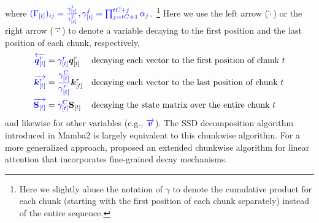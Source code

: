 \documentclass{article}
\def\rmS{{\mathbf{S}}}
\def\vk{{\bm{k}}}
\def\vq{{\bm{q}}}
\def\vv{{\bm{v}}}
\begin{document}
where ${\color{blue}(\Gamma_{[t]})_{ij} = \frac{\gamma_{[t]}^i}{\gamma_{[t]}^j}, \gamma_{[t]}^j = \prod_{j=tC+1}^{tC+j} \alpha_j}$.~\footnote{Here we slightly abuse the notation of $\gamma$ to denote the cumulative product for each chunk (starting with the first position of each chunk separately) instead of the entire sequence.}  Here we use the left arrow ($\overleftarrow{\cdot}$) or the right arrow ($\overrightarrow{\cdot}$) to denote a variable decaying to the first position and the last position of each chunk, respectively, \begin{align}    {\color{blue}\overleftarrow{\vq_{[t]}^r}} &= {\color{blue}\gamma_{[t]}^r} \vq_{[t]}^r && \text{decaying each vector to the first position of  chunk $t$} \nonumber \\ 
{\color{blue}\overrightarrow{\vk_{[t]}^r}} &= {\color{blue}\frac{\gamma_{[t
]}^{C}}{\gamma_{[t]}^r}} \vk_{[t]}^r  && \text{decaying each vector to the last position of  chunk $t$} \nonumber \\ 
{\color{blue}\overrightarrow{\rmS_{[t]}}} &= {\color{blue}\gamma_{[t]}^C}\rmS_{[t]}  && \text{decaying the state matrix over the entire chunk $t$} 
\label{eq:def_notation}
\end{align}
and likewise for other variables (e.g., ${\color{blue}\overrightarrow{\vv}}$). The SSD decomposition algorithm introduced in Mamba2 is largely equivalent to this chunkwise algorithm. For a more generalized approach, \citet{yang_gated_2023} proposed an extended chunkwise algorithm for linear attention that incorporates fine-grained decay mechanisms.
\vspace{-2mm}
\end{document}
